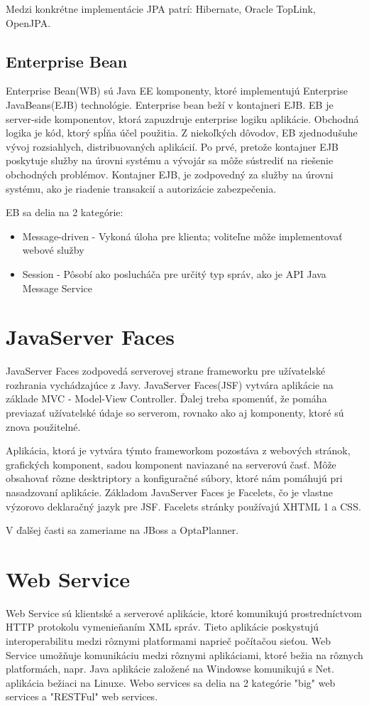 Medzi konkrétne implementácie JPA patrí: Hibernate, Oracle TopLink, OpenJPA.

\subsection{Enterprise Bean}
Enterprise Bean(WB) sú Java EE komponenty, ktoré implementujú Enterprise JavaBeans(EJB) technológie. Enterprise bean beží v kontajneri EJB. EB je server-side komponentov, ktorá zapuzdruje enterprise logiku aplikácie. Obchodná logika je kód, ktorý spĺňa účel použitia. Z niekoľkých dôvodov, EB zjednodušuhe vývoj rozsiahlych, distribuovaných aplikácií. Po prvé, pretože kontajner EJB poskytuje služby na úrovni systému a vývojár sa môže sústrediť na riešenie obchodných problémov. Kontajner EJB, je zodpovedný za služby na úrovni systému, ako je riadenie transakcií a autorizácie zabezpečenia.


EB sa delia na 2 kategórie:
\begin{itemize}
\item Message-driven - Vykoná úloha pre klienta; voliteľne môže implementovať webové služby
\item Session - Pôsobí ako poslucháča pre určitý typ správ, ako je API Java Message Service

\end{itemize}



\section{JavaServer Faces}
JavaServer Faces zodpovedá serverovej strane frameworku pre užívatelské rozhrania vychádzajúce z Javy. JavaServer Faces(JSF) vytvára aplikácie na základe MVC - Model-View Controller. Ďalej treba spomenúť, že pomáha previazať užívatelské údaje so serverom, rovnako ako aj komponenty, ktoré sú znova použitelné.

\indent Aplikácia, ktorá je vytvára týmto frameworkom pozostáva z webových stránok, grafických komponent, sadou komponent naviazané na serverovú časť. Môže obsahovať rôzne desktriptory a konfiguračné súbory, ktoré nám pomáhujú pri nasadzovaní aplikácie. Základom JavaServer Faces je Facelets, čo je vlastne výzorovo deklaračný jazyk pre JSF. Facelets stránky používajú XHTML 1 a CSS. 


V ďalšej časti sa zameriame na JBoss a OptaPlanner.

\section{Web Service}
Web Service  sú klientské a serverové aplikácie, ktoré komunikujú prostredníctvom HTTP protokolu vymenieňaním XML správ. Tieto aplikácie poskystujú interoperabilitu medzi rôznymi platformami naprieč počítačou sieťou. Web Service umožňuje komunikáciu medzi rôznymi aplikáciami, ktoré bežia na rôznych platformách, napr. Java aplikácie založené na Windowse komunikujú s Net. aplikácia bežiaci na Linuxe. Webo services  sa delia na 2 kategórie "big" web services a "RESTFul" web services.

